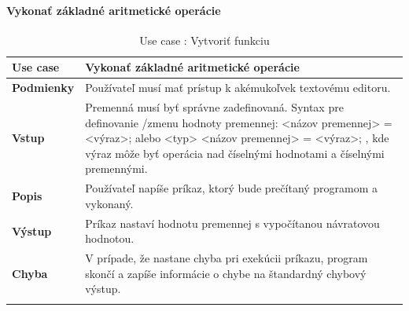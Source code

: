 \paragraph{Vykonať základné aritmetické operácie}
\begin{center}
	\begin{longtable}{|p{2.5cm}|p{12.2cm}|}
		
			\hline
			\textbf{Use case} & Vykonať základné aritmetické operácie \\ 
			\hline
			\textbf{Podmienky} & Používateľ musí mať prístup k akémukoľvek textovému editoru.  \\ 
			\hline
			\textbf{Vstup} & Premenná musí byť správne zadefinovaná. 
			\newline
			Syntax pre definovanie /zmenu hodnoty premennej: 
			\newline
			<názov premennej> = <výraz>; alebo 
			\newline
			<typ> <názov premennej> = <výraz>;
			\newline
			, kde výraz môže byť operácia nad číselnými hodnotami a číselnými premennými. \\
			\hline
			\textbf{Popis} & Používateľ napíše príkaz, ktorý bude prečítaný programom a vykonaný.\\ 
			\hline
			\textbf{Výstup} & Príkaz nastaví hodnotu premennej s vypočítanou návratovou hodnotou.\\
			\hline
			\textbf{Chyba} & V prípade, že nastane chyba pri exekúcii príkazu, program skončí a zapíše informácie o chybe na štandardný chybový výstup.\\
			\hline
		\caption{Use case : Vytvoriť funkciu}
		\label{table:1}
		
	\end{longtable}
\end{center}
